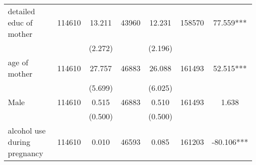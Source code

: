 \begin{tabular}{@{\extracolsep{5pt}}lcccccc}
detailed educ of mother   & 114610    & 13.211    & 43960    & 12.231    & 158570    & 77.559***   \\                                                                                                                                                                                                                                                                                          
 &   & (2.272)  &   & (2.196)  &   &  \\ [1ex]                                                                                                                                                                                                                                                                                                                                                 
age of mother   & 114610    & 27.757    & 46883    & 26.088    & 161493    & 52.515***   \\                                                                                                                                                                                                                                                                                                    
 &   & (5.699)  &   & (6.025)  &   &  \\ [1ex]                                                                                                                                                                                                                                                                                                                                                 
Male   & 114610    & 0.515    & 46883    & 0.510    & 161493    & 1.638   \\                                                                                                                                                                                                                                                                                                                   
 &   & (0.500)  &   & (0.500)  &   &  \\ [1ex]                                                                                                                                                                                                                                                                                                                                                 
alcohol use during pregnancy   & 114610    & 0.010    & 46593    & 0.085    & 161203    & -80.106***   \\                                                                                                                                                                                                                                                                                      

\end{tabular}
